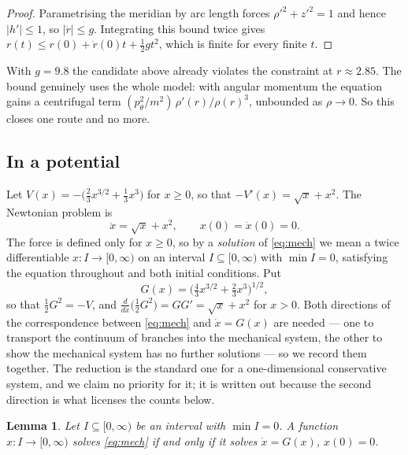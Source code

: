 \documentclass[12pt]{article}
\theoremstyle{plain}
\newtheorem{lemma}[theorem]{Lemma}
\theoremstyle{definition}
\theoremstyle{remark}
\begin{document}
\begin{proof}
Parametrising the meridian by arc length forces $\rho'^{2}+z'^{2}=1$ and hence
$|h'|\le1$, so $|\ddot r|\le g$. Integrating this bound twice gives
$r(t)\le r(0)+\dot r(0)t+\tfrac12 g t^{2}$, which is finite for every finite
$t$.
\end{proof}

With $g=9.8$ the candidate above already violates the constraint at
$r\approx2.85$. The bound genuinely uses the whole model: with angular momentum
the equation gains a centrifugal term
$(p_{\theta}^{2}/m^{2})\,\rho'(r)/\rho(r)^{3}$, unbounded as $\rho\to0$. So this
closes one route and no more.

\subsection{In a potential}

Let $V(x)=-\big(\tfrac23 x^{3/2}+\tfrac13 x^{3}\big)$ for $x\ge0$, so that
$-V'(x)=\sqrt x+x^{2}$. The Newtonian problem is
\begin{equation}\label{eq:mech}
  \ddot x=\sqrt x+x^{2},\qquad x(0)=\dot x(0)=0 .
\end{equation}
The force is defined only for $x\ge0$, so by a \emph{solution} of
\eqref{eq:mech} we mean a twice differentiable $x\colon I\to[0,\infty)$ on an
interval $I\subseteq[0,\infty)$ with $\min I=0$, satisfying the equation
throughout and both initial conditions. Put
\[
  G(x)=\Big(\tfrac43 x^{3/2}+\tfrac23 x^{3}\Big)^{1/2},
\]
so that $\tfrac12 G^{2}=-V$, and
$\tfrac{d}{dx}\big(\tfrac12 G^{2}\big)=GG'=\sqrt x+x^{2}$ for $x>0$.
Both directions of the correspondence between \eqref{eq:mech} and
$\dot x=G(x)$ are needed --- one to transport the continuum of branches into the
mechanical system, the other to show the mechanical system has no further
solutions --- so we record them together. The reduction is the standard one for
a one-dimensional conservative system, and we claim no priority for it; it is
written out because the second direction is what licenses the counts below.

\begin{lemma}\label{lem:mech}
Let $I\subseteq[0,\infty)$ be an interval with $\min I=0$. A function
$x\colon I\to[0,\infty)$ solves \eqref{eq:mech} if and only if it solves
$\dot x=G(x)$, $x(0)=0$.
\end{lemma}
\end{document}
